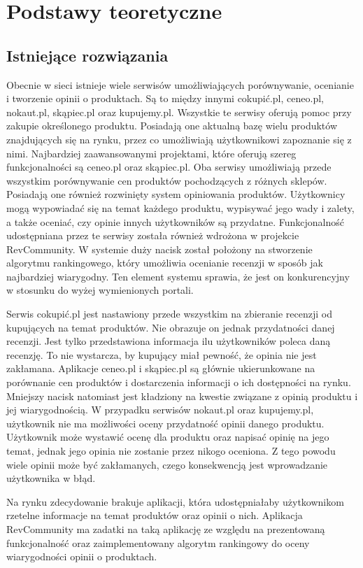 \chapter{Podstawy teoretyczne}

\section{Istniejące rozwiązania}
Obecnie w sieci istnieje wiele serwisów umożliwiających porównywanie, ocenianie i tworzenie opinii o produktach. Są to między innymi cokupić.pl,  ceneo.pl, nokaut.pl, skąpiec.pl oraz kupujemy.pl. Wszystkie te serwisy oferują pomoc przy zakupie określonego produktu. Posiadają one aktualną bazę wielu produktów znajdujących się na rynku, przez co umożliwiają użytkownikowi zapoznanie się z nimi. Najbardziej zaawansowanymi projektami, które oferują szereg funkcjonalności są ceneo.pl oraz skąpiec.pl. Oba serwisy umożliwiają przede wszystkim porównywanie cen produktów pochodzących z różnych sklepów. Posiadają one  również rozwinięty system opiniowania produktów. Użytkownicy mogą wypowiadać się na temat każdego produktu, wypisywać jego wady i zalety, a także oceniać, czy opinie innych użytkowników są przydatne. Funkcjonalność udostępniana przez te serwisy została również wdrożona w projekcie RevCommunity. W systemie duży nacisk został położony na stworzenie algorytmu rankingowego, który umożliwia ocenianie recenzji w sposób jak najbardziej wiarygodny. Ten element systemu sprawia, że jest on konkurencyjny w stosunku do wyżej wymienionych portali. 

Serwis cokupić.pl jest nastawiony przede wszystkim na zbieranie recenzji od kupujących na temat produktów. Nie obrazuje on jednak przydatności danej recenzji. Jest tylko przedstawiona informacja ilu użytkowników poleca daną recenzję. To nie wystarcza, by kupujący miał pewność, że opinia nie jest zakłamana. Aplikacje ceneo.pl i skąpiec.pl są głównie ukierunkowane na porównanie cen produktów i dostarczenia informacji o ich dostępności na rynku. Mniejszy nacisk natomiast jest kładziony na kwestie związane z opinią produktu i jej wiarygodnością.  W przypadku serwisów nokaut.pl oraz kupujemy.pl, użytkownik nie ma możliwości oceny przydatność opinii danego produktu. Użytkownik może wystawić ocenę dla produktu oraz napisać opinię na jego temat, jednak jego opinia nie zostanie przez nikogo oceniona. Z tego powodu wiele opinii może być zakłamanych, czego konsekwencją jest wprowadzanie użytkownika w błąd. 

Na rynku zdecydowanie brakuje aplikacji, która udostępniałaby użytkownikom rzetelne informacje na temat produktów oraz opinii o nich. Aplikacja RevCommunity ma zadatki na taką aplikację ze względu na prezentowaną funkcjonalność oraz zaimplementowany algorytm rankingowy do oceny wiarygodności opinii o produktach. 



